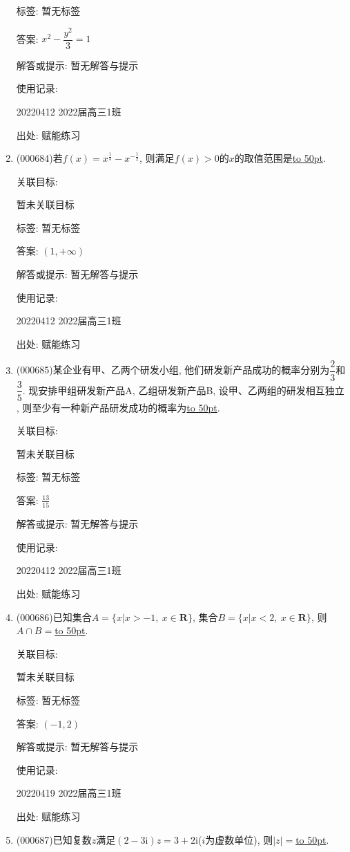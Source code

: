 \documentclass[10pt,a4paper]{article}
\newcommand{\blank}[1]{\underline{\hbox to #1pt{}}}
\begin{document}
\begin{enumerate}[1.]
标签: 暂无标签

答案: $x^2-\dfrac{y^2}3=1$

解答或提示: 暂无解答与提示

使用记录:

20220412	2022届高三1班	


出处: 赋能练习
\item { (000684)}若$f(x)={x^{\frac13}}-{x^{-\frac12}}$, 则满足$f(x)>0$的$x$的取值范围是\blank{50}.


关联目标:

暂未关联目标



标签: 暂无标签

答案: $(1,+\infty)$

解答或提示: 暂无解答与提示

使用记录:

20220412	2022届高三1班	


出处: 赋能练习
\item { (000685)}某企业有甲、乙两个研发小组, 他们研发新产品成功的概率分别为$\dfrac23$和$\dfrac35$. 现安排甲组研发新产品A, 乙组研发新产品B, 设甲、乙两组的研发相互独立 , 则至少有一种新产品研发成功的概率为\blank{50}.


关联目标:

暂未关联目标



标签: 暂无标签

答案: $\frac{13}{15}$

解答或提示: 暂无解答与提示

使用记录:

20220412	2022届高三1班	


出处: 赋能练习
\item { (000686)}已知集合$A=\{x|x>-1, \ x\in \mathbf{R}\}$, 集合$B=\{x|x<2, \ x\in \mathbf{R}\}$, 则$A\cap B=$\blank{50}.


关联目标:

暂未关联目标



标签: 暂无标签

答案: $(-1,2)$

解答或提示: 暂无解答与提示

使用记录:

20220419	2022届高三1班	


出处: 赋能练习
\item { (000687)}已知复数$z$满足$(2-3\mathrm{i})z=3+2\mathrm{i}$($i$为虚数单位), 则$|z|=$\blank{50}.



\end{enumerate}
\end{document}
